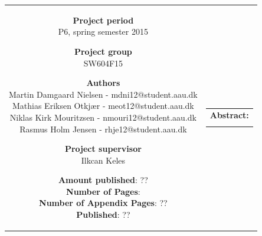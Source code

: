 \begin{nopagebreak}
{\begin{tabular}{cc}
{        \textbf{Project period}     \\ P6, spring semester 2015  \\

        \textbf{Project group}      \\ SW604F15                  \\

        \textbf{Authors}            \\
        Martin Damgaard Nielsen - mdni12@student.aau.dk    \\
        Mathias Eriksen Otkjær  - meot12@student.aau.dk    \\
        Niklas Kirk Mouritzsen  - nmouri12@student.aau.dk  \\
        Rasmus Holm Jensen      -  rhje12@student.aau.dk   \\

        \textbf{Project supervisor} \\ Ilkcan Keles    \\

        \textbf{Amount published}: ??                  \\
        \textbf{Number of Pages}: \pageref{LastPage}   \\
        \textbf{Number of Appendix Pages}: ??          \\
        \textbf{Published}: ??                         \\

        \vfill 

    } &
    \parbox{7cm}
    {
        \vspace{.15cm}
        \hfill 
        \begin{tabular}{l}
            {\bf Abstract:}\bigskip \\
            \fbox{
                \parbox{7cm}
                {
                    \bigskip
                    {\vfill{\small \bigskip}}
                }
            }
        \end{tabular}
    }

\end{tabular}}
\\ \\ \\ \\ \\ \\ \\ \\ \\ \\ \\ \\ \\ \\

\begin{center}
\end{center}

\restoregeometry
\end{nopagebreak}